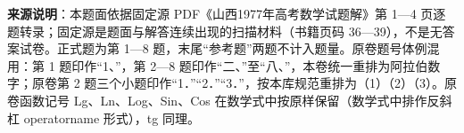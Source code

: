 


\begin{gktip}
\textbf{来源说明}：本题面依据固定源 PDF《山西1977年高考数学试题解》第 1—4 页逐题转录；固定源是题面与解答连续出现的扫描材料（书籍页码 36—39），不是无答案试卷。正式题为第 1—8 题，末尾“参考题”两题不计入题量。原卷题号体例混用：第 1 题印作“1、”，第 2—8 题印作“二、”至“八、”，本卷统一重排为阿拉伯数字；原卷第 2 题三个小题印作“1．”“2．”“3．”，按本库规范重排为（1）（2）（3）。原卷函数记号 Lg、Ln、Log、Sin、Cos 在数学式中按原样保留（数学式中排作反斜杠 operatorname 形式），tg 同理。
\end{gktip}

\par\medskip

